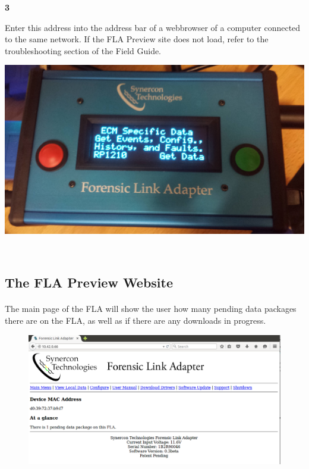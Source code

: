 \documentclass[11pt]{article}
\begin{document}
\noindent\begin{minipage}{0.3\textwidth}%
\begin{center}
\textbf{3}\\[\baselineskip]
\end{center}
Enter this address into the address bar of a webbrowser of a computer connected to the same network. If the FLA Preview site does not load, refer to the troubleshooting section of the Field Guide.
\end{minipage}%
\hfill%
\begin{minipage}{0.6\textwidth}
\includegraphics[width=\linewidth]{../../media/fla_screens/ecm_confirm}
\end{minipage}\\[\baselineskip]
\subsection{The FLA Preview Website}
\paragraph{}
The main page of the FLA will show the user how many pending data packages there are on the FLA, as well as if there are any downloads in progress.
\begin{figure}[tbph]
\centering
\includegraphics[width=.95\linewidth]{../../media/fla_preview_screenshots/main_page}
\label{fig:fla_preview_main_page}
\end{figure}
\end{document}
